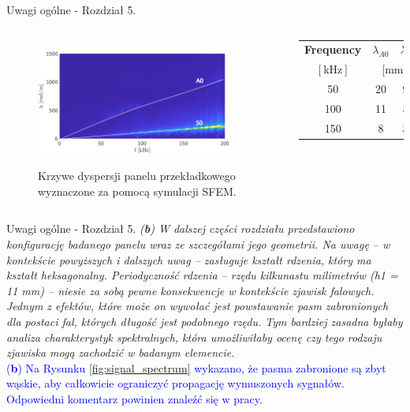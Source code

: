 \documentclass[10pt,aspectratio=169]{beamer} %
\begin{document}
\begin{frame}[label=frame13]{Uwagi ogólne - Rozdział 5.}\justifying
	\begin{columns}
	\begin{figure}
		\centering
		\caption{Krzywe dyspersji panelu przekładkowego wyznaczone za pomocą symulacji SFEM.}
		\includegraphics[width=0.9\textwidth]{figs/dispersion}
		\label{fig:dispersion}
	\end{figure}
	\begin{tabular}{ccc}
		\textbf{Frequency} & {\(\lambda_{A0}\)} & {\(\lambda_{S0}\)}\\
		\([\mathrm{kHz}]\) & \multicolumn{2}{c}{[mm]} \\\midrule
		50 & 20 & 98 \\
		100 & 11 & 57 \\
		150 & 8 & 36 
	\end{tabular}
\end{columns}
\end{frame}
\begin{frame}[label=frame14]{Uwagi ogólne - Rozdział 5.}\justifying
\textit{(\textbf{b}) W dalszej części rozdziału przedstawiono konfigurację badanego panelu wraz ze szczegółami jego geometrii. Na uwagę – w kontekście powyższych i dalszych uwag – zasługuje kształt rdzenia, który ma kształt heksagonalny. Periodyczność rdzenia – rzędu kilkunastu milimetrów (h1 = 11 mm) – niesie za sobą pewne konsekwencje w kontekście zjawisk falowych. Jednym z efektów, które może on wywołać jest powstawanie pasm zabronionych dla postaci fal, których długość jest podobnego rzędu. Tym bardziej zasadna byłaby analiza charakterystyk spektralnych, która umożliwiłaby ocenę czy tego rodzaju zjawiska mogą zachodzić w badanym elemencie.}\\
\textcolor{blue}{(\textbf{b}) Na Rysunku \ref{fig:signal_spectrum} wykazano, że pasma zabronione są zbyt wąskie, aby całkowicie ograniczyć propagację wymuszonych sygnałów. Odpowiedni komentarz powinien znaleźć się w pracy.}
\end{frame}
\end{document}
